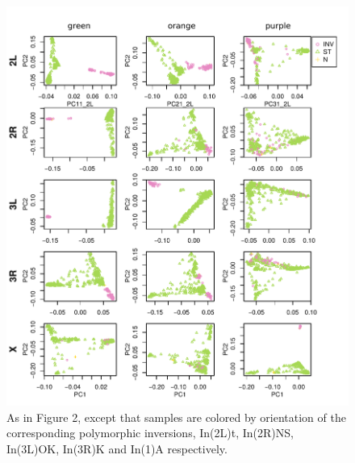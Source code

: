 \documentclass[11pt, oneside]{article}   	%
\begin{document}
\begin{figure}
    \begin{center}
       \includegraphics{Fig3_pca_plots_color_by_inv_allchr_with_ChrX_In1A}
    \end{center}
    \caption{
         As in Figure 2, except that samples are colored by orientation of the corresponding polymorphic inversions, 
         In(2L)t, In(2R)NS, In(3L)OK, In(3R)K and In(1)A respectively. 
         \citep[data from][]{lack2015drosophila}
        \label{fig:pca_by_inversion}
    }
\end{figure}
\end{document}
